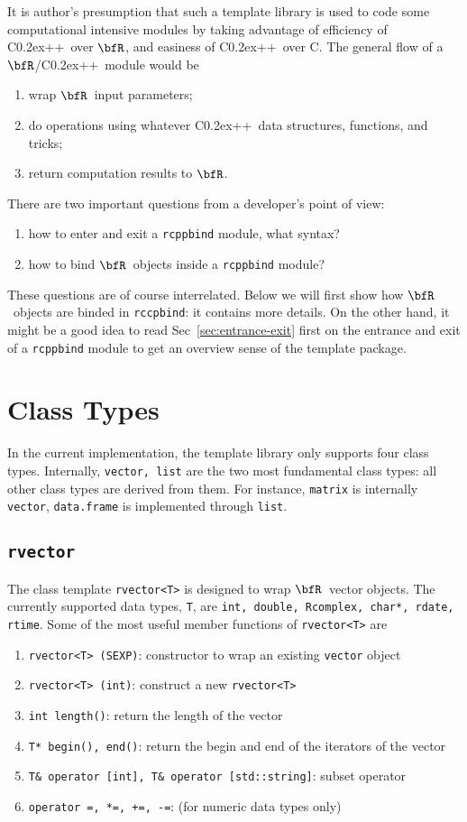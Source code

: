 \documentclass{article}
\def\C++{C{\raise 0.2ex\hbox{++}}}
\newcommand{\R}{$\bfR$}
\begin{document}
It is author's presumption that such a template library is
used to code some computational intensive modules by taking
advantage of efficiency of \C++\ over \R, and easiness of
\C++\ over C. The general flow of a \R/\C++\ module would be
\begin{enumerate}
  \item wrap \R\ input parameters;
  \item do operations using whatever \C++\ data structures,
    functions, and tricks;
  \item return computation results to \R.
\end{enumerate}
There are two important questions from a developer's point of
view:
\begin{enumerate}
  \item how to enter and exit a \texttt{rcppbind} module, what syntax?
  \item how to bind \R\ objects inside a \texttt{rcppbind} module?
\end{enumerate}
These questions are of course interrelated. Below we will
first show how \R\ objects are binded in \texttt{rccpbind}:
it contains more details. On the other hand, it might be a
good idea to read Sec~\ref{sec:entrance-exit} first on the
entrance and exit of a \texttt{rcppbind} module to get
an overview sense of the template package.

\section{Class Types}\label{sec:classtypes}

In the current implementation, the template library only
supports four class types. Internally, \texttt{vector, list}
are the two most fundamental class types: all other class
types are derived from them. For instance, \texttt{matrix} is
internally \texttt{vector}, \texttt{data.frame} is
implemented through \texttt{list}.

\subsection{\texttt{rvector}}

The class template \texttt{rvector<T>} is designed to wrap
\R\ vector objects. The currently supported data types,
\texttt{T}, are \texttt{int, double, Rcomplex, char*, rdate,
rtime}.  Some of the most useful member functions of
\texttt{rvector<T>} are
\begin{enumerate}
  \item \texttt{rvector<T> (SEXP)}: constructor to wrap an
    existing \texttt{vector} object
  \item \texttt{rvector<T> (int)}: construct a new
    \texttt{rvector<T>}
  \item \texttt{int length()}: return the length of the
    vector
  \item \texttt{T* begin(), end()}: return the begin and end
    of the iterators of the vector
  \item \texttt{T\& operator [int], T\& operator [std::string]}: subset operator
  \item \texttt{operator =, *=, +=, -=}: (for numeric data
    types only)
\end{enumerate}
\end{document}
